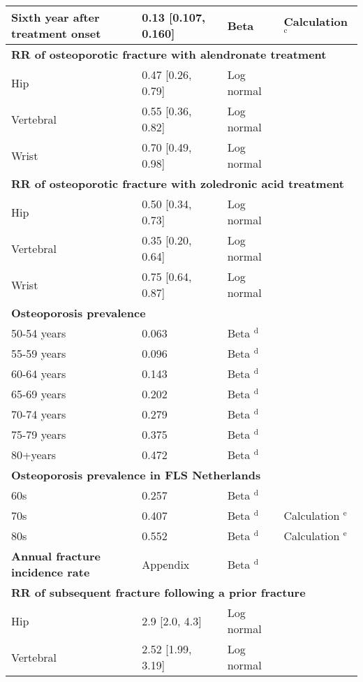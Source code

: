 \begin{center}
{\begin{longtable}{m{5.3cm}lll}
Sixth year after treatment onset & 0.13 [0.107, 0.160] & Beta & Calculation $^{\mathrm{c}}$\\
\midrule
\multicolumn{4}{l}{{\bf RR of osteoporotic fracture with alendronate treatment}}\\
\midrule
Hip & 0.47 [0.26, 0.79] & Log normal & \cite{4-32}\\
Vertebral & 0.55 [0.36, 0.82] & Log normal & \cite{4-32}\\
Wrist & 0.70 [0.49, 0.98] & Log normal & \cite{4-32}\\
\midrule
\multicolumn{4}{l}{{\bf RR of osteoporotic fracture with zoledronic acid treatment}}\\
\midrule
Hip & 0.50 [0.34, 0.73] & Log normal & \cite{4-31}\\
Vertebral & 0.35 [0.20, 0.64] & Log normal & \cite{4-31}\\
Wrist & 0.75 [0.64, 0.87] & Log normal & \cite{4-33}\\
\midrule
\multicolumn{4}{l}{{\bf Osteoporosis prevalence}}\\
\midrule
50-54 years & 0.063 & Beta $^{\mathrm{d}}$ & \cite{4-43}\\
55-59 years & 0.096 & Beta $^{\mathrm{d}}$ & \cite{4-43}\\
60-64 years & 0.143 & Beta $^{\mathrm{d}}$ & \cite{4-43}\\
65-69 years & 0.202 & Beta $^{\mathrm{d}}$ & \cite{4-43}\\
70-74 years & 0.279 & Beta $^{\mathrm{d}}$ & \cite{4-43}\\
75-79 years & 0.375 & Beta $^{\mathrm{d}}$ & \cite{4-43}\\
80+years & 0.472 & Beta $^{\mathrm{d}}$ & \cite{4-43}\\
\midrule
\multicolumn{4}{l}{{\bf Osteoporosis prevalence in FLS Netherlands}}\\
\midrule
60s & 0.257 & Beta $^{\mathrm{d}}$ & \cite{4-44}\\
70s & 0.407 & Beta $^{\mathrm{d}}$ & Calculation $^{\mathrm{e}}$\\
80s & 0.552 & Beta $^{\mathrm{d}}$ & Calculation $^{\mathrm{e}}$\\
\midrule
{\bf Annual fracture incidence rate} & Appendix & Beta $^{\mathrm{d}}$ & \cite{4-47}\\
\midrule
\multicolumn{4}{l}{{\bf RR of subsequent fracture following a prior fracture}}\\
\midrule
Hip & 2.9 [2.0, 4.3] & Log normal & \cite{4-50}\\
Vertebral & 2.52 [1.99, 3.19] & Log normal & \cite{4-51}\\

\end{longtable}}
\end{center}

